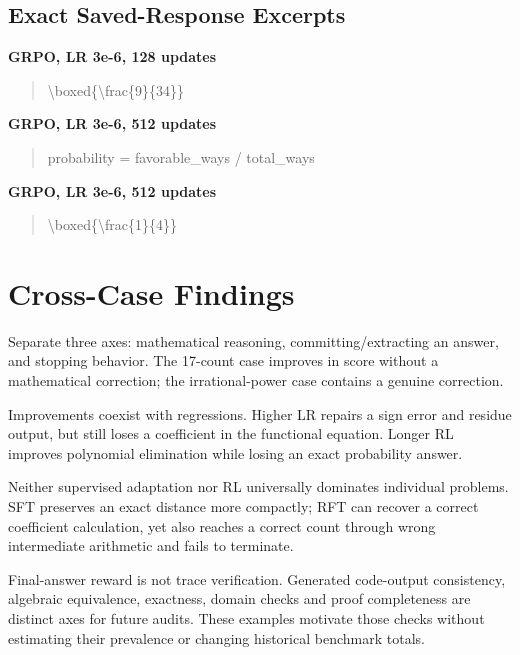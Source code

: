 \documentclass[10pt,letterpaper]{article}
\begin{document}
\subsection*{Exact Saved-Response Excerpts}
\textbf{GRPO, LR 3e-6, 128 updates}
\begin{quote}\small\raggedright \textbackslash{}boxed\{\textbackslash{}frac\{9\}\{34\}\}\end{quote}
\textbf{GRPO, LR 3e-6, 512 updates}
\begin{quote}\small\raggedright probability = favorable\_ways / total\_ways\end{quote}
\textbf{GRPO, LR 3e-6, 512 updates}
\begin{quote}\small\raggedright \textbackslash{}boxed\{\textbackslash{}frac\{1\}\{4\}\}\end{quote}
\clearpage\section*{Cross-Case Findings}
Separate three axes: mathematical reasoning, committing/extracting an answer, and stopping behavior. The 17-count case improves in score without a mathematical correction; the irrational-power case contains a genuine correction.


Improvements coexist with regressions. Higher LR repairs a sign error and residue output, but still loses a coefficient in the functional equation. Longer RL improves polynomial elimination while losing an exact probability answer.


Neither supervised adaptation nor RL universally dominates individual problems. SFT preserves an exact distance more compactly; RFT can recover a correct coefficient calculation, yet also reaches a correct count through wrong intermediate arithmetic and fails to terminate.


Final-answer reward is not trace verification. Generated code-output consistency, algebraic equivalence, exactness, domain checks and proof completeness are distinct axes for future audits. These examples motivate those checks without estimating their prevalence or changing historical benchmark totals.
\end{document}
